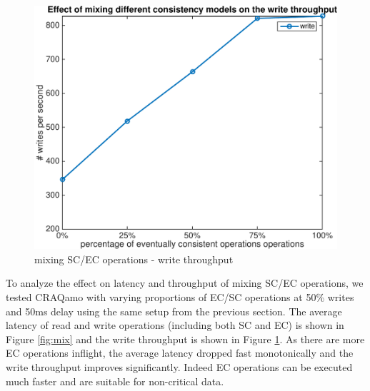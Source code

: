 \begin{figure}[hbt]
\centering
\includegraphics[width=\linewidth]{figures/throughput.pdf}
\caption{mixing SC/EC operations - write throughput}
\label{fig:mix_throughput}
\end{figure}


To analyze the effect on latency and throughput of mixing SC/EC operations, we tested CRAQamo with varying proportions of EC/SC operations at 50\% writes and 50ms delay using the same setup from the previous section. The average latency of read and write operations (including both SC and EC) is shown in Figure \ref{fig:mix} and the write throughput is shown in Figure \ref{fig:mix_throughput}.  As there are more EC operations inflight, the average latency dropped fast monotonically and the write throughput improves significantly. Indeed EC operations can be executed much faster and are suitable for non-critical data.


